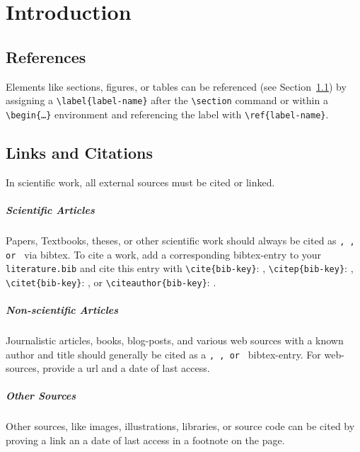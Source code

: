 \chapter{Introduction}\label{structure}


\enlargethispage{\baselineskip}

\section{References}\label{references}

Elements like sections, figures, or tables can be referenced (see Section~\ref{references}) by assigning a \texttt{\textbackslash label\{label-name\}} after the  \texttt{\textbackslash section} command or within a \texttt{\textbackslash begin\{\dots\}} environment and referencing the label with \texttt{\textbackslash ref\{label-name\}}. 

\section{Links and Citations}

In scientific work, all external sources must be cited or linked. 

\paragraph{Scientific Articles} Papers, Textbooks, theses, or other scientific work should always be cited as \texttt{\@Article, \@InProceedings, or \@Book} via bibtex. To cite a work, add a corresponding bibtex-entry to your \texttt{literature.bib} and cite this entry with \texttt{\textbackslash cite\{bib-key\}}: \cite{manning:2001}, \texttt{\textbackslash citep\{bib-key\}}: \citep{manning:2001}, \texttt{\textbackslash citet\{bib-key\}}: \citet{manning:2001}, or \texttt{\textbackslash citeauthor\{bib-key\}}: \citeauthor{manning:2001}. 

\paragraph{Non-scientific Articles} Journalistic articles, books, blog-posts, and various web sources with a known author and title should generally be cited as a \texttt{\@Article, \@Book, or \@Misc} bibtex-entry. For web-sources, provide a url and a date of last access.

\paragraph{Other Sources} Other sources, like images, illustrations, libraries, or source code can be cited by proving a link an a date of last access in a footnote on the page.  



